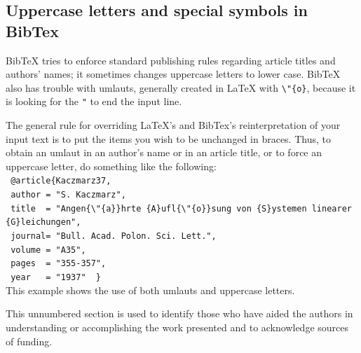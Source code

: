 \documentclass[]{spie}  %
\begin{document}
\subsection{Uppercase letters and special symbols in BibTex} 

BibTeX tries to enforce standard publishing rules regarding article titles and authors' names; it sometimes changes uppercase letters to lower case. BibTeX also has trouble with umlauts, generally created in LaTeX with \verb+\"{o}+, because it is looking for the \verb+"+ to end the input line. 

The general rule for overriding LaTeX's and BibTex's reinterpretation of your input text is to put the items you wish to be unchanged in braces. Thus, to obtain an umlaut in an author's name or in an article title, or to force an uppercase letter, do something like the following: \\[1ex]
\verb+ @article{Kaczmarz37,+ \\ 
\verb+ author = "S. Kaczmarz",+ \\ 
\verb+ title  = "Angen{\"{a}}hrte {A}ufl{\"{o}}sung von {S}ystemen linearer {G}leichungen",+ \\ 
\verb+ journal= "Bull. Acad. Polon. Sci. Lett.",+ \\ 
\verb+ volume = "A35",+ \\ 
\verb+ pages  = "355-357",+ \\	
\verb+ year   = "1937"	} + \\[1ex]
This example shows the use of both umlauts and uppercase letters.
\acknowledgments     %
 
This unnumbered section is used to identify those who have aided the authors in understanding or accomplishing the work presented and to acknowledge sources of funding.  


\end{document}
